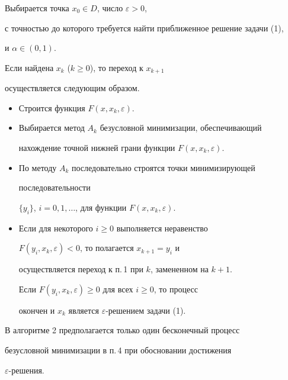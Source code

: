 \begin{alg}


Выбирается точка $x_0\in D$, число $\varepsilon>0$,


с точностью до которого требуется найти приближенное решение задачи (1),


и $\alpha\in (0,1)$.


 


Если найдена $x_k$ ($k\geq0$), то переход к $x_{k+1}$


осуществляется следующим образом.


\begin{itemize}


\item[1.] Строится функция $F(x,x_k,\varepsilon)$.


\item[2.] Выбирается метод $A_k$ безусловной минимизации, обеспечивающий


нахождение точной нижней грани функции $F(x,x_k,\varepsilon)$.


\item[3.] По методу $A_k$ последовательно строятся точки минимизирующей


последовательности


$\{y_i\}$, $i=0,1,\dotsc$, для функции $F(x,x_k,\varepsilon)$.


\item[4.] Если для некоторого $i\ge0$ выполняется неравенство


$F(y_i,x_k,\varepsilon)<0$, то полагается $x_{k+1}=y_i$ и


осуществляется переход к п.\,1 при $k$, замененном на $k+1$.


Если $F(y_i,x_k,\varepsilon)\ge0$ для всех $i\ge0$, то процесс


окончен и $x_k$ является $\varepsilon$-решением задачи (1).


\end{itemize}


\end{alg}





\begin{notenonum}


В алгоритме 2 предполагается только один бесконечный процесс


безусловной минимизации в п.\,4 при обосновании достижения


$\varepsilon$-решения.


\end{notenonum}





